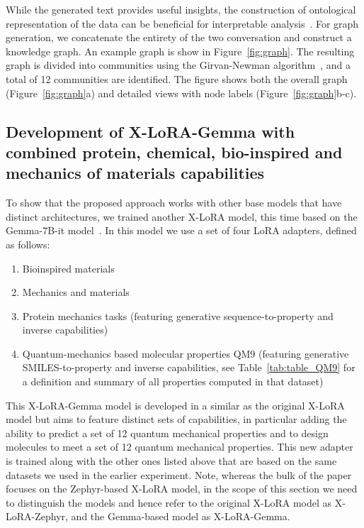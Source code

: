 While the generated text provides useful insights, the construction of ontological representation of the data can be beneficial for interpretable analysis~\cite{Buehler2023MechGPTModalities}. For graph generation, we concatenate the entirety of the two conversation and construct a knowledge graph. An example graph is show in Figure~\ref{fig:graph}. The resulting graph is divided into communities using the Girvan-Newman algorithm~\cite{Girvan2002CommunityNetworks}, and a total of 12 communities are identified. The figure shows both the overall graph (Figure~\ref{fig:graph}a) and detailed views with node labels (Figure~\ref{fig:graph}b-c). 





\subsection{Development of X-LoRA-Gemma with combined protein, chemical, bio-inspired and mechanics of materials capabilities}
\label{gemma-section}

To show that the proposed approach works with other base models that have distinct architectures, we trained another X-LoRA model, this time based on the Gemma-7B-it model~\cite{Google/gemma-7b-itFace}. In this model we use a set of four LoRA adapters, defined as follows:
\begin{enumerate}
    \item Bioinspired materials  
    \item Mechanics and materials
    \item Protein mechanics tasks (featuring generative sequence-to-property and inverse capabilities)
    \item Quantum-mechanics based molecular properties QM9 (featuring generative SMILES-to-property and inverse capabilities, see Table~\ref{tab:table_QM9} for a definition and summary of all properties computed in that dataset)~\cite{Ruddigkeit2012EnumerationGDB-17,Ramakrishnan2015ElectronicSpace}
\end{enumerate}


This X-LoRA-Gemma model is developed in a similar as the original X-LoRA model but aims to feature distinct sets of capabilities, in particular adding the ability to predict a set of 12 quantum mechanical properties and to design molecules to meet a set of 12 quantum mechanical properties. This new adapter is trained along with the other ones listed above that are based on the same datasets we used in the earlier experiment. Note, whereas the bulk of the paper focuses on the Zephyr-based X-LoRA model, in the scope of this section we need to distinguish the models and hence refer to the original X-LoRA model as  X-LoRA-Zephyr, and the Gemma-based model as X-LoRA-Gemma.


